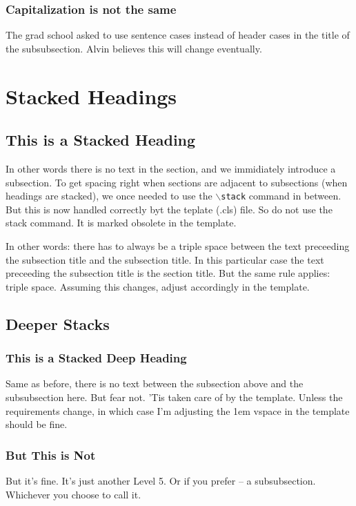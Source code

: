 \subsubsection{Capitalization is not the same}
The grad school asked to use sentence cases instead of header cases in the title of the subsubsection. 
Alvin believes this will change eventually. 

\section{Stacked Headings}

\stack

\subsection{This is a Stacked Heading}
In other words there is no text in the section, and we immidiately introduce a subsection. 
To get spacing right when sections are adjacent to subsections (when headings are stacked), 
we once needed to use the \texttt{$\backslash$stack} command in between.
But this is now handled correctly byt the teplate (.cls) file. So do not use the stack command. 
It is marked obsolete in the template. 

In other words: there has to always be a triple space between the text preceeding the subsection title and the subsection title. 
In this particular case the text preceeding the subsection title is the section title. 
But the same rule applies: triple space. 
Assuming this changes, adjust accordingly in the template. 

\subsection{Deeper Stacks}

\stack %

\subsubsection{This is a Stacked Deep Heading}
Same as before, there is no text between the subsection above and the subsubsection here. 
But fear not. 'Tis taken care of by the template. 
Unless the requirements change, in which case I'm adjusting the 1em vspace in the template should be fine.

\subsubsection{But This is Not}
But it's fine. It's just another Level 5. Or if you prefer -- a subsubsection. Whichever you choose to call it. 